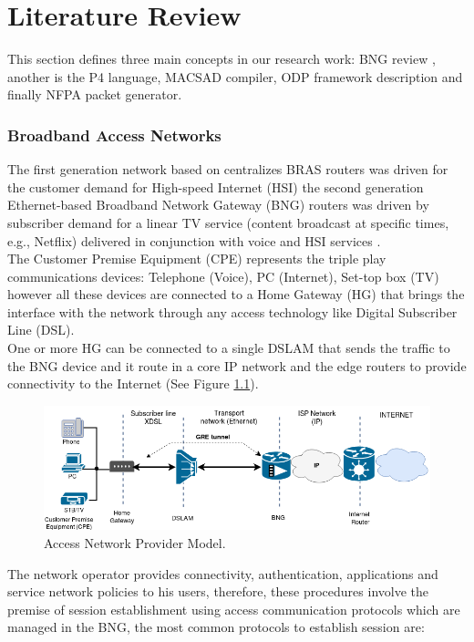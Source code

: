 \chapter{Literature Review}
\label{cap:cap02}
 This section defines three main concepts in our research work: \gls{BNG} review , another is the \acrshort{P4} language, MACSAD compiler, ODP framework description and finally NFPA packet generator.

\subsection{Broadband Access Networks}

 The first generation network based on centralizes BRAS routers was driven for the customer demand for High-speed Internet (HSI) the second generation Ethernet-based Broadband Network Gateway (BNG) routers was driven by subscriber demand for a linear TV service (content broadcast at specific times, e.g., Netflix) delivered in conjunction with voice and HSI services \cite{Alcatel}.\\
 The Customer Premise Equipment (CPE) represents the triple play communications devices: Telephone (Voice), PC (Internet), Set-top box (TV) however all these devices are connected to a Home Gateway (HG) that brings the interface with the network through any access technology like Digital Subscriber Line (DSL).\\
 One or more HG can be connected to a single DSLAM that sends the traffic to the BNG device and it route in a core IP network and the edge routers to provide connectivity to the Internet (See Figure \ref{fig:arch}).\\
 \begin{figure}[!h]
 	\centering
 	\includegraphics[width=0.8\linewidth]{figures/bng_architect.png}
 	\caption{Access Network Provider Model.}
 	\label{fig:arch}
\end{figure}
The network operator provides connectivity, authentication, applications and service network  policies to his users, therefore, these procedures involve the premise of session establishment using access communication protocols which are managed in the BNG, the most common protocols to establish session are:
